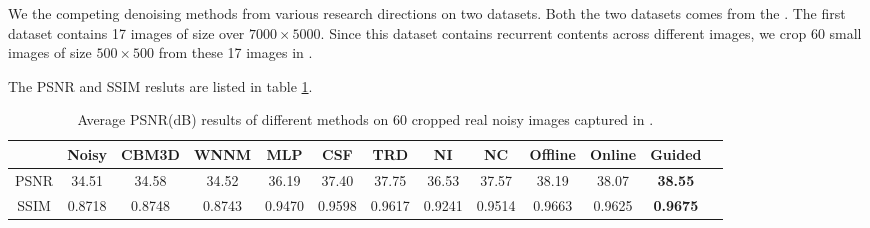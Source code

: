 \documentclass[10pt,twocolumn,letterpaper]{article}
\begin{document}
We  the competing denoising methods from various research directions on two datasets. Both the two datasets comes from the \cite{crosschannel2016}. The first dataset contains 17 images of size over $7000\times5000$. Since this dataset contains recurrent contents across different images, we crop 60 small images of size $500\times500$ from these 17 images in \cite{crosschannel2016}.

The PSNR and SSIM resluts are listed in table \ref{tab1}.
\begin{table}\label{tab1}
\caption{Average PSNR(dB) results of different methods on 60 cropped real noisy images captured in \cite{crosschannel2016}.}
\label{tab1}
\begin{center}
\renewcommand\arraystretch{1}
\begin{tabular}{|c||c|c|c|c|c|c|c|c|c|c|c|c|}
\hline
 & \textbf{Noisy} &\textbf{CBM3D}&\textbf{WNNM}&\textbf{MLP}&\textbf{CSF}&\textbf{TRD}& \textbf{NI}& \textbf{NC}&\textbf{Offline} &\textbf{Online} &\textbf{Guided} 
\\
\hline
PSNR & 34.51  &  34.58 &  34.52  & 36.19   & 37.40 & 37.75 &  36.53  &  37.57  &  38.19   & 38.07 &  \textbf{ 38.55}
\\
\hline
SSIM & 0.8718  & 0.8748  & 0.8743   & 0.9470 & 0.9598 &  0.9617 & 0.9241  &  0.9514  &  0.9663   & 0.9625 &   \textbf{0.9675}
\\
\hline
\end{tabular}
\end{center}
\end{table}
\end{document}
